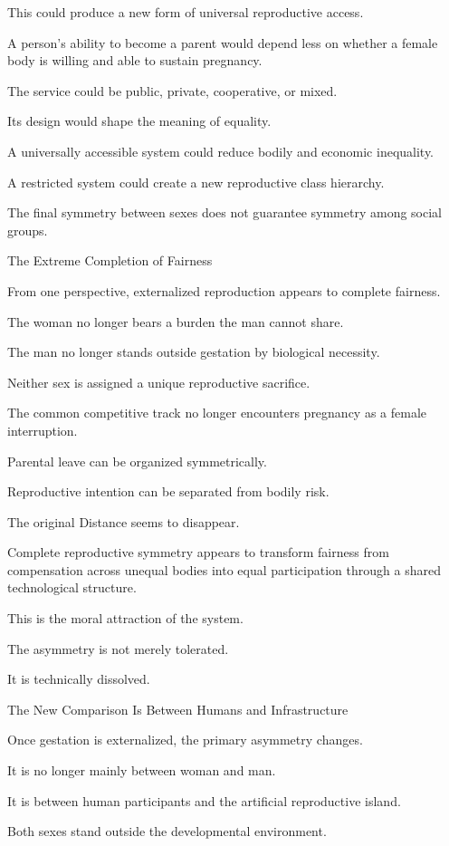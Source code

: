 This could produce a new form of universal reproductive access.

A person’s ability to become a parent would depend less on whether a female body is willing and able to sustain pregnancy.

The service could be public, private, cooperative, or mixed.

Its design would shape the meaning of equality.

A universally accessible system could reduce bodily and economic inequality.

A restricted system could create a new reproductive class hierarchy.

The final symmetry between sexes does not guarantee symmetry among social groups.

The Extreme Completion of Fairness

From one perspective, externalized reproduction appears to complete fairness.

The woman no longer bears a burden the man cannot share.

The man no longer stands outside gestation by biological necessity.

Neither sex is assigned a unique reproductive sacrifice.

The common competitive track no longer encounters pregnancy as a female interruption.

Parental leave can be organized symmetrically.

Reproductive intention can be separated from bodily risk.

The original Distance seems to disappear.

Complete reproductive symmetry appears to transform fairness from compensation across unequal bodies into equal participation through a shared technological structure.

This is the moral attraction of the system.

The asymmetry is not merely tolerated.

It is technically dissolved.

The New Comparison Is Between Humans and Infrastructure

Once gestation is externalized, the primary asymmetry changes.

It is no longer mainly between woman and man.

It is between human participants and the artificial reproductive island.

Both sexes stand outside the developmental environment.

